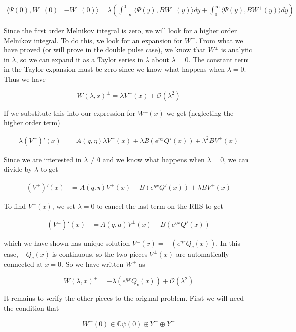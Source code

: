 \documentclass[12pt]{article}
\def\C{{\mathbb C}}
\begin{document}
\begin{align*}
\langle\Psi(0), W^-(0) &- W^+(0)\rangle = \lambda\left( \int_{-\infty}^0 \langle \Psi(y), B W^-(y) \rangle dy + \int_0^\infty \langle \Psi(y), B W^+(y) \rangle dy \right)
\end{align*}

Since the first order Melnikov integral is zero, we will look for a higher order Melnikov integral. To do this, we look for an expansion for $W^\pm$. From what we have proved (or will prove in the double pulse case), we know that $W^\pm$ is analytic in $\lambda$, so we can expand it as a Taylor series in $\lambda$ about $\lambda = 0$. The constant term in the Taylor expansion must be zero since we know what happens when $\lambda = 0$. Thus we have

\[
W(\lambda, x)^\pm = \lambda V^\pm(x) + \mathcal{O}(\lambda^2)
\]

If we substitute this into our expression for $W^\pm(x)$ we get (neglecting the higher order term)

\begin{align*}
\lambda (V^\pm)'(x) &= A(q, \eta) \lambda V^\pm(x) + \lambda B (e^{\eta x} Q'(x)) + \lambda^2 B V^\pm(x) 
\end{align*}

Since we are interested in $\lambda \neq 0$ and we know what happens when $\lambda = 0$, we can divide by $\lambda$ to get

\begin{align*}
(V^\pm)'(x) &= A(q, \eta)V^\pm(x) + B (e^{\eta x} Q'(x)) + \lambda B V^\pm(x) 
\end{align*}

To find $V^\pm(x)$, we set $\lambda = 0$ to cancel the last term on the RHS to get

\begin{align*}
(V^\pm)'(x) &= A(q, a) V^\pm(x) + B (e^{\eta x} Q'(x)) 
\end{align*}

which we have shown has unique solution $V^\pm(x) = -(e^{\eta x} Q_c(x))$. In this case, $-Q_c(x)$ is continuous, so the two pieces $V^\pm(x)$ are automatically connected at $x = 0$. So we have written $W^\pm$ as

\[
W(\lambda, x)^\pm = -\lambda (e^{\eta x} Q_c(x)) + \mathcal{O}(\lambda^2)
\]

It remains to verify the other pieces to the original problem. First we will need the condition that

\[
W^\pm(0) \in \C \psi(0) \oplus Y^+ \oplus Y^- 
\]
\end{document}
